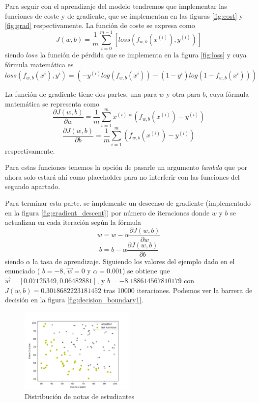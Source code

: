 \documentclass[6pt]{../../shared/AiTex}
\begin{document}
Para seguir con el aprendizaje del modelo tendremos que implementar las funciones de coste y de gradiente, que se implementan en las figuras \ref{fig:cost} y \ref{fig:grad} respectivamente. La función de coste se expresa como \[J(w,b) = \frac{1}{m} \sum_{i=0}^{m -1} [loss(f_{w,b}(x^{(i)}),y^{(i)})]\] siendo $loss$ la función de pérdida que se implementa en la figura \ref{fig:loss} y cuya fórmula matemática es \[loss(f_{w,b}(x^{i}), y^{i}) = (-y^{(i)}log(f_{w,b}(x^{i})) - (1-y^{i})log(1-f_{w,b}(x^{i})))\]

La función de gradiente tiene dos partes, una para $w$ y otra para $b$, cuya fórmula matemática se representa como \[\frac{\partial J(w,b)}{\partial w} = \frac{1}{m} \sum_{i=1}^{m} x^{(i)} * (f_{w,b}(x^{(i)}) - y^{(i)})\] \[\frac{\partial J(w,b)}{\partial b} = \frac{1}{m} \sum_{i=1}^{m} (f_{w,b}(x^{(i)}) - y^{(i)})\] respectivamente.

Para estas funciones tenemos la opción de pasarle un argumento \textit{lambda} que por ahora solo estará ahí como placeholder para no interferir con las funciones del segundo apartado.

Para terminar esta parte. se implemente un descenso de gradiente (implementado en la figura \ref{fig:gradient_descent}) por número de iteraciones donde $w$ y $b$ se actualizan en cada iteración según la fórmula \[w = w - \alpha \frac{\partial J(w,b)}{\partial w}\] \[b = b - \alpha \frac{\partial J(w,b)}{\partial b}\] siendo $\alpha$ la tasa de aprendizaje. Siguiendo los valores del ejemplo dado en el enunciado ( $b = -8$, $\vec{w} = 0$ y $\alpha = 0.001$) se obtiene que $\vec{w} = [0.07125349, 0.06482881]$, y $b = -8.188614567810179$ con $J(w,b) = 0.3018682223181452$ tras 10000 iteraciones. Podemos ver la barrera de decisión en la figura \ref{fig:decision_boundary1}.

\begin{figure}[H]
    \centering
    \includegraphics[width=0.5\textwidth]{./imagenes/muestreo1.png}
    \caption{Distribución de notas de estudiantes}
    \label{fig:dataset1}
\end{figure}
\end{document}

